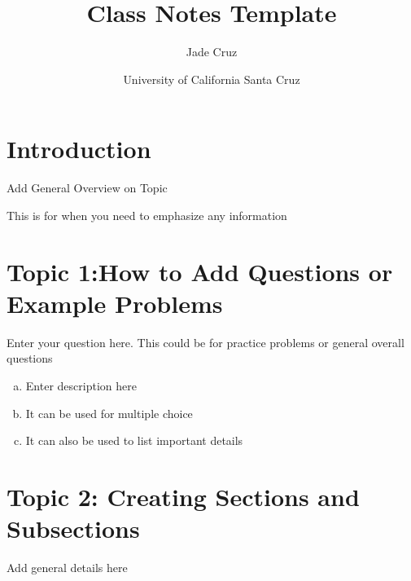 \documentclass{article}
\title{Class Notes Template} %
\author{Jade Cruz}
\date{University of California Santa Cruz}
\begin{document}
\maketitle %

\tableofcontents %


\section*{Introduction} %
Add General Overview on Topic
\begin{info} %
    This is for when you need to emphasize any information
\end{info}

\section{Topic 1:How to Add Questions or Example Problems}
\begin{question}
Enter your question here. This could be for practice problems or general overall questions
 
	\begin{enumerate}[(a)]
                \item Enter description here
                \item It can be used for multiple choice
                \item It can also be used to list important details
	\end{enumerate}
\end{question}


\section{Topic 2: Creating Sections and Subsections}
Add general details here
\end{document}
